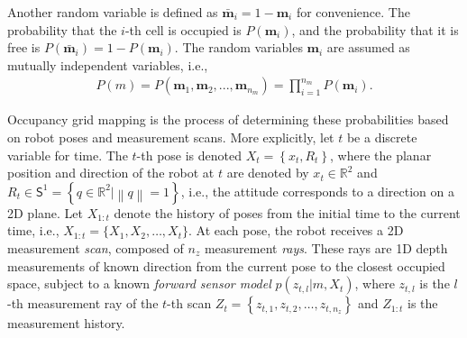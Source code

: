 \documentclass[letterpaper, 10pt, conference]{ieeeconf}
\newcommand{\norm}[1]{\ensuremath{\left\| #1 \right\|}}
\newcommand{\braces}[1]{\ensuremath{\left\{ #1 \right\}}}
\renewcommand{\Re}{\ensuremath{\mathbb{R}}}
\newcommand{\Sph}{\ensuremath{\mathsf{S}}}
\begin{document}
Another random variable is defined as $\bar{\mathbf{m}}_i=1-\mathbf{m}_i$ for convenience. The probability that the $i$-th cell is occupied is $P(\mathbf{m}_i)$, and the probability that it is free is $P(\bar{\mathbf{m}}_i)=1-P(\mathbf{m}_i)$. The random variables $\mathbf{m}_i$ are assumed as mutually independent variables, i.e.,
\begin{align}
P(m)=P(\mathbf{m}_1,\mathbf{m}_2,...,\mathbf{m}_{n_m})=\prod_{i=1}^{n_m}P(\mathbf{m}_i).
\end{align}

Occupancy grid mapping is the process of determining these probabilities based on robot poses and measurement scans. 
More explicitly, let $t$ be a discrete variable for time. The $t$-th pose is denoted $X_t=\braces{x_t,R_t}$, where the planar position and direction of the robot at $t$ are denoted by $x_t\in\Re^2$ and $R_t\in\Sph^1=\braces{q\in\Re^2|\norm{q}=1}$, i.e., the attitude corresponds to a direction on a 2D plane. 
 Let $X_{1:t}$ denote the history of poses from the initial time to the current time, i.e., $X_{1:t}=\{X_1,X_2,\ldots, X_t\}$. At each pose, the robot receives a 2D measurement \emph{scan}, composed of $n_z$ measurement \emph{rays}. These rays are 1D depth measurements of known direction from the current pose to the closest occupied space, subject to a known \emph{forward sensor model} $p(z_{t,l}|m,X_t)$, where $z_{t,l}$ is the $l$-th measurement ray of the $t$-th scan $Z_t=\braces{z_{t,1},z_{t,2},\ldots,z_{t,n_z}}$ and $Z_{1:t}$ is the measurement history. 
\end{document}
